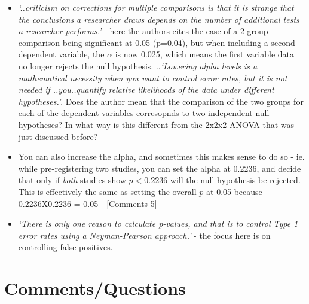 \documentclass[
]{book}
\begin{document}
\begin{itemize}
\item
  \emph{`..criticism on corrections for multiple comparisons is that it is strange that the conclusions a researcher draws depends on the number of additional tests a researcher performs.'} - here the authors cites the case of a 2 group comparison being significant at 0.05 (p=0.04), but when including a second dependent variable, the \(\alpha\) is now 0.025, which means the first variable data no longer rejects the null hypothesis. ..\emph{`Lowering alpha levels is a mathematical necessity when you want to control error rates, but it is not needed if ..you..quantify relative likelihoods of the data under different hypotheses.'}. Does the author mean that the comparison of the two groups for each of the dependent variables corresopnds to two independent null hypotheses? In what way is this different from the 2x2x2 ANOVA that was just discussed before?
\item
  You can also increase the alpha, and sometimes this makes sense to do so - ie. while pre-registering two studies, you can set the alpha at 0.2236, and decide that only if \emph{both} studies show \(p<0.2236\) will the null hypothesis be rejected. This is effectively the same as setting the overall \(p\) at 0.05 because 0.2236X0.2236 = 0.05 - {[}Comments 5{]}
\item
  \emph{`There is only one reason to calculate p-values, and that is to control Type 1 error rates using a Neyman-Pearson approach.'} - the focus here is on controlling false positives.
\end{itemize}

\hypertarget{lakens_com}{%
\section{Comments/Questions}\label{lakens_com}}
\end{document}

